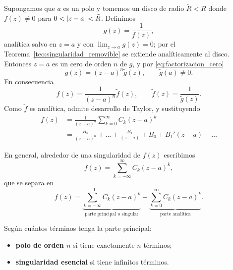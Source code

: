 Supongamos que $a$ es un polo y tomemos un disco de radio $\tilde{R}<R$ donde
$f(z)\neq 0$ para $0<\lvert z-a \rvert<\tilde{R}$. Definimos
\begin{equation}
  \label{eq:g_reciproca}
  g(z)=\frac{1}{f(z)},
\end{equation}
anal\'itica salvo en $z=a$ y con $\lim_{z\rightarrow a}g(z)=0$; por el
Teorema~\ref{teo:singularidad_removible} se extiende anal\'iticamente al
disco. Entonces $z=a$ es un cero de orden $n$ de $g$, y por
\eqref{eq:factorizacion_cero}
\begin{equation}
  \label{eq:g_factorizada}
  g(z)=(z-a)^n\tilde{g}(z),
  \qquad \tilde{g}(a)\neq 0 .
\end{equation}
En consecuencia
\begin{equation}
  \label{eq:f_polo}
  f(z)=\frac{1}{(z-a)^n}\tilde{f}(z),
  \qquad
  \tilde{f}(z)=\frac{1}{\tilde{g}(z)} .
\end{equation}
Como $\tilde{f}$ es anal\'itica, admite desarrollo de Taylor, y sustituyendo
\begin{equation}
  \label{eq:laurent_desarrollo}
  \begin{aligned}
    f(z)&=\frac{1}{(z-a)^n}\sum_{k=0}^{\infty}C_k(z-a)^k\\
        &=\frac{B_n}{(z-a)^n}+\dots+\frac{B_1}{(z-a)}
          +B_0+B_1'(z-a)+\dots
  \end{aligned}
\end{equation}

\begin{definicion}
  \label{def:laurent}
  En general, alrededor de una singularidad de $f(z)$ escribimos
  \begin{equation}
    \label{eq:laurent}
    f(z)=\sum_{k=-\infty}^{\infty}C_k(z-a)^k,
  \end{equation}
  que se separa en
  \begin{equation}
    \label{eq:laurent_partes}
    f(z)=\underbrace{\sum_{k=-\infty}^{-1}C_k(z-a)^k}
           _{\text{parte principal o singular}}
      +\underbrace{\sum_{k=0}^{\infty}C_k(z-a)^k}
           _{\text{parte anal\'itica}} .
  \end{equation}
\end{definicion}

Seg\'un cu\'antos t\'erminos tenga la parte principal:
\begin{itemize}
  \item \textbf{polo de orden $n$} si tiene exactamente $n$ t\'erminos;
  \item \textbf{singularidad esencial} si tiene infinitos t\'erminos.
\end{itemize}
